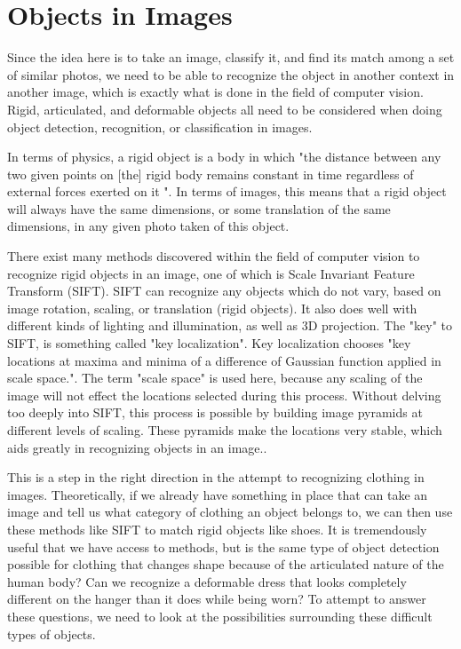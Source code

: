 \documentclass[12pt]{report} %
\begin{document}
\section{Objects in Images}

	Since the idea here is to take an image, classify it, and find its match among a set of similar photos, we need to be able to recognize the object in another context in another image, which is exactly what is done in the field of computer vision. Rigid, articulated, and deformable objects all need to be considered when doing object detection, recognition, or classification in images. 
	
	In terms of physics, a rigid object is a body in which "the distance between any two given points on [the] rigid body remains constant in time regardless of external forces exerted on it "\cite{RigidBodyWiki}. In terms of images, this means that a rigid object will always have the same dimensions, or some translation of the same dimensions, in any given photo taken of this object. 
	
	There exist many methods discovered within the field of computer vision to recognize rigid objects in an image, one of which is Scale Invariant Feature Transform (SIFT)\cite{lowe1999object}. SIFT can recognize any objects which do not vary, based on image rotation, scaling, or translation (rigid objects). It also does well with different kinds of lighting and illumination, as well as 3D projection\cite{lowe1999object}. The "key" to SIFT, is something called "key localization". Key localization chooses "key locations at maxima and minima of a difference of Gaussian function applied in scale space."\cite{lowe1999object}. The term "scale space" is used here, because any scaling of the image will not effect the locations selected during this process. Without delving too deeply into SIFT, this process is possible by building image pyramids at different levels of scaling. These pyramids make the locations very stable, which aids greatly in recognizing objects in an image.\cite{lowe1999object}.

	This is a step in the right direction in the attempt to recognizing clothing in images. Theoretically, if we already have something in place that can take an image and tell us what category of clothing an object belongs to, we can then use these methods like SIFT to match rigid objects like shoes. It is tremendously useful that we have access to methods, but is the same type of object detection possible for clothing that changes shape because of the articulated nature of the human body? Can we recognize a deformable dress that looks completely different on the hanger than it does while being worn? To attempt to answer these questions, we need to look at the possibilities surrounding these difficult types of objects. 
	
\end{document}
